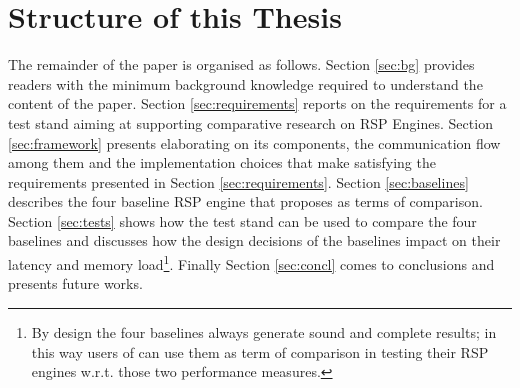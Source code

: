 \section{Structure of this Thesis}\label{sec:thesis-structure-intro}
The remainder of the paper is organised as follows. Section \ref{sec:bg} provides readers with the minimum background knowledge required to understand the content of the paper. Section  \ref{sec:requirements} reports on the requirements for a test stand aiming at supporting comparative research on RSP Engines. Section \ref{sec:framework} presents \name elaborating on its components, the communication flow among them and the implementation choices that make \name satisfying the requirements presented in Section \ref{sec:requirements}. Section
 \ref{sec:baselines} describes the four baseline RSP engine that \name proposes as terms of comparison. Section \ref{sec:tests} shows how the test stand can be used to compare the four baselines and discusses how the design decisions of the baselines impact on their latency and memory load\footnote{By design the four baselines always generate sound and complete results; in this way users of \name can use them as term of comparison in testing their RSP engines w.r.t. those two performance measures.}. Finally Section \ref{sec:concl} comes to conclusions and presents future works.